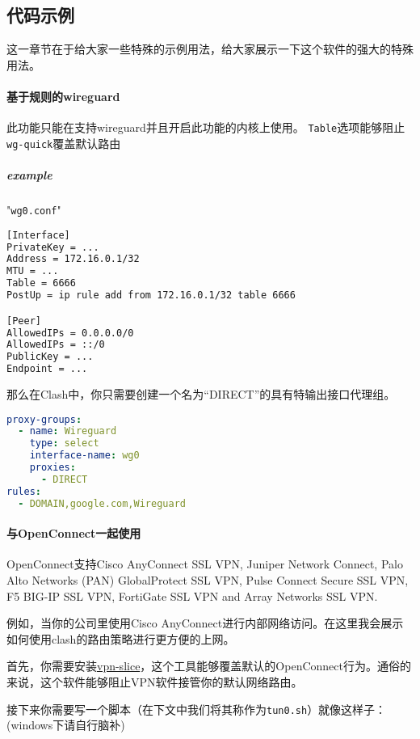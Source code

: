 \subsection{代码示例}
这一章节在于给大家一些特殊的示例用法，给大家展示一下这个软件的强大的特殊用法。
\paragraph{基于规则的wireguard} 此功能只能在支持wireguard并且开启此功能的内核上使用。
\verb|Table|选项能够阻止\verb|wg-quick|覆盖默认路由

\subparagraph{example}"\verb|wg0.conf|"

\begin{lstlisting}[breaklines=true,language=sh]
[Interface]
PrivateKey = ...
Address = 172.16.0.1/32
MTU = ...
Table = 6666
PostUp = ip rule add from 172.16.0.1/32 table 6666

[Peer]
AllowedIPs = 0.0.0.0/0
AllowedIPs = ::/0
PublicKey = ...
Endpoint = ...
\end{lstlisting}

那么在Clash中，你只需要创建一个名为“DIRECT”的具有特输出接口代理组。

\begin{lstlisting}[breaklines=true,language=yaml,style=yaml]
proxy-groups:
  - name: Wireguard
    type: select
    interface-name: wg0
    proxies:
      - DIRECT
rules:
  - DOMAIN,google.com,Wireguard
\end{lstlisting}

\paragraph{与OpenConnect一起使用}OpenConnect支持Cisco AnyConnect SSL VPN, Juniper Network Connect, Palo Alto Networks (PAN) GlobalProtect SSL VPN, Pulse Connect Secure SSL VPN, F5 BIG-IP SSL VPN, FortiGate SSL VPN and Array Networks SSL VPN.

例如，当你的公司里使用Cisco AnyConnect进行内部网络访问。在这里我会展示如何使用clash的路由策略进行更方便的上网。

首先，你需要安装\href{https://github.com/dlenski/vpn-slice#requirements}{vpn-slice}，这个工具能够覆盖默认的OpenConnect行为。通俗的来说，这个软件能够阻止VPN软件接管你的默认网络路由。

接下来你需要写一个脚本（在下文中我们将其称作为\verb|tun0.sh|）就像这样子：(windows下请自行脑补)


